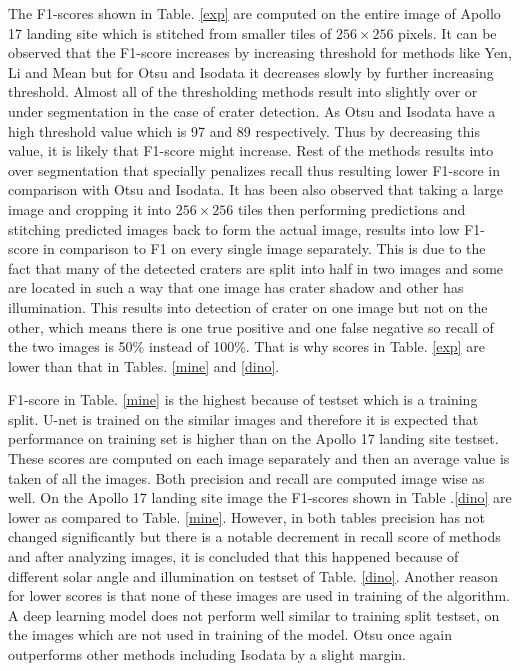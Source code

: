 \documentclass[11pt]{article}
\begin{document}
The F1-scores shown in Table. \ref{exp} are computed on the entire image of Apollo 17 landing site which is stitched from smaller tiles of $256 \times 256$ pixels. It can be observed that the F1-score increases by increasing threshold for methods like Yen, Li and Mean but for Otsu and Isodata it decreases slowly by further increasing threshold. Almost all of the thresholding methods result into slightly over or under segmentation in the case of crater detection. As Otsu and Isodata have a high threshold value which is 97 and 89 respectively. Thus by decreasing this value, it is likely that F1-score might increase. Rest of the methods results into over segmentation that specially penalizes recall thus resulting lower F1-score in comparison with Otsu and Isodata. It has been also observed that taking a large image and cropping it into $256 \times 256$ tiles then performing predictions and stitching predicted images back to form the actual image, results into low F1-score in comparison to F1 on every single image separately. This is due to the fact that many of the detected craters are split into half in two images and some are located in such a way that one image has crater shadow and other has illumination. This results into detection of crater on one image but not on the other, which means there is one true positive and one false negative so recall of the two images is 50\% instead of 100\%. That is why scores in Table. \ref{exp} are lower than that in Tables. \ref{mine} and \ref{dino}.

F1-score in Table. \ref{mine} is the highest because of testset which is a training split. U-net is trained on the similar images and therefore it is expected that performance on training set is higher than on the Apollo 17 landing site testset. These scores are computed on each image separately and then an average value is taken of all the images. Both precision and recall are computed image wise as well. On the Apollo 17 landing site image the F1-scores shown in Table .\ref{dino} are lower as compared to Table. \ref{mine}. However, in both tables precision has not changed significantly but there is a notable decrement in recall score of methods and after analyzing images, it is concluded that this happened because of different solar angle and illumination on testset of Table. \ref{dino}. Another reason for lower scores is that none of these images are used in training of the algorithm. A deep learning model does not perform well similar to training split testset, on the images which are not used in training of the model. Otsu once again outperforms other methods including Isodata by a slight margin.
\end{document}
